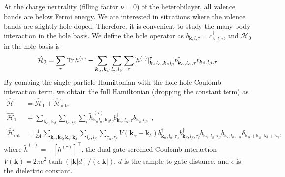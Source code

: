 \documentclass[aps,prl,onecolumn,superscriptaddress,longbibliography]{revtex4-2}
\begin{document}
At the charge neutrality (filling factor $\nu=0$) of the heterobilayer, all valence bands are below Fermi energy. We are interested in situations where the valence bands are slightly hole-doped. Therefore, it is convenient to study the many-body interaction in the hole basis.
We define the hole operator as $b_{\bm{k},l,\tau}=c_{\bm{k},l,\tau}^\dagger$,  and $\hat{\mathcal{H}}_0$ in the hole basis is
\begin{equation}
    \hat{\mathcal{H}}_0 = \sum_\tau\Tr h^{(\tau)}-\sum_{\bm{k}_{\alpha},\bm{k}_{\beta}}\sum_{l_{\alpha},l_{\beta}}\sum_{\tau} [h^{(\tau)}]^{\intercal}_{\bm{k}_{\alpha}l_{\alpha},\bm{k}_{\beta}l_{\beta}} b_{\bm{k}_{\alpha},l_{\alpha},\tau}^\dagger b_{\bm{k}_{\beta},l_{\beta},\tau}
\end{equation}
By combing the single-particle Hamiltonian with the hole-hole Coulomb interaction term, we obtain the full Hamiltonian (dropping the constant term) as
\begin{equation}\label{eq:full}
    \begin{split}
    \hat{\mathcal{H}}&=\hat{\mathcal{H}}_1+\hat{\mathcal{H}}_{\text{int}},\\
        \hat{\mathcal{H}}_1&=\sum_{\bm{k}_{\alpha},\bm{k}_{\beta}}\sum_{l_{\alpha},l_{\beta}}\sum_{\tau} \tilde{h}^{(\tau)}_{\bm{k}_{\alpha}l_{\alpha},\bm{k}_{\beta}l_{\beta}} b_{\bm{k}_{\alpha},l_{\alpha},\tau}^\dagger b_{\bm{k}_{\beta},l_{\beta},\tau},\\
        \hat{\mathcal{H}}_{\text{int}}&=\frac{1}{2A} \sum_{\bm{k}_{\alpha},\bm{k}_{\beta},\bm{k}_{\gamma},\bm{k}_{\delta}  }\sum_{l_{\alpha},l_{\beta}}\sum_{\tau_{\alpha},\tau_{\beta}} V(\bm{k}_{\alpha}-\bm{k}_{\delta}) b_{\bm{k}_{\alpha},l_{\alpha},\tau_{\alpha}}^\dagger b_{\bm{k}_{\beta},l_{\beta},\tau_{\beta}}^\dagger b_{\bm{k}_{\gamma},l_{\beta},\tau_{\beta}} b_{\bm{k}_{\delta},l_{\alpha},\tau_{\alpha}} \delta_{\bm{k}_{\alpha}+\bm{k}_{\beta}, \bm{k}_{\delta}+\bm{k}_{\gamma}},
    \end{split}
\end{equation}
where $\tilde{h}^{(\tau)}=-[h^{(\tau)}]^{\intercal}$, the dual-gate screened Coulomb interaction $V(\bm{k})= {2\pi e^2\tanh(|\bm{k}|d)}/{(\epsilon |\bm{k}|)}$, $d$ is the sample-to-gate distance, and $\epsilon$ is the dielectric constant.
\end{document}
